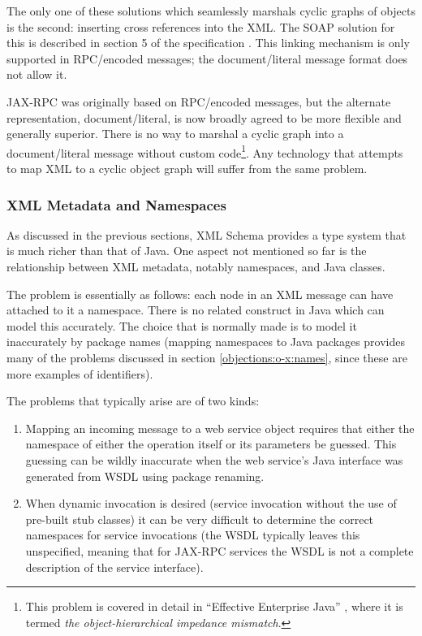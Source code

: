 The only one of these solutions which seamlessly marshals cyclic
graphs of objects is the second: inserting cross references into the
XML. The SOAP solution for this is described in section 5 of the
specification \cite{spec:SOAP1.1}. This linking mechanism is only
supported in RPC/encoded messages; the document/literal message format
does not allow it.

JAX-RPC was originally based on RPC/encoded messages, but the
alternate representation, document/literal, is now broadly agreed to
be more flexible and generally superior. There is no way to marshal a
cyclic graph into a document/literal message without custom
code\footnote{This problem is covered in detail in ``Effective
Enterprise Java'' \cite{neward:EEJ}, where it is termed
\emph{the object-hierarchical impedance mismatch}.}. Any technology
that attempts to map XML to a cyclic object graph will suffer from the
same problem.

\subsubsection{XML Metadata and Namespaces}
\label{objections:o-x:namespaces}

As discussed in the previous sections, XML Schema provides a type
system that is much richer than that of Java. One aspect not mentioned
so far is the relationship between XML metadata, notably namespaces,
and Java classes.

The problem is essentially as follows: each node in an XML message can
have attached to it a namespace. There is no related construct in Java
which can model this accurately. The choice that is normally made is
to model it inaccurately by package names (mapping namespaces to Java
packages provides many of the problems discussed in section
\ref{objections:o-x:names}, since these are more examples of identifiers). 

The problems that typically arise are of two kinds:
\begin{enumerate}
\item Mapping an incoming message to a web service object requires
that either the namespace of either the operation itself or its
parameters be guessed. This guessing can be wildly inaccurate when the
web service's Java interface was generated from WSDL using package
renaming.
\item When dynamic invocation is desired (service invocation without
the use of pre-built stub classes) it can be very difficult to
determine the correct namespaces for service invocations (the WSDL
typically leaves this unspecified, meaning that for JAX-RPC services
the WSDL is not a complete description of the service interface).
\end{enumerate}

